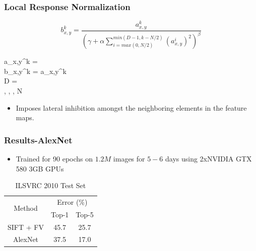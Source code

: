\documentclass[9pt]{beamer}
\begin{document}
\begin{frame}
	\frametitle{Local Response Normalization}
	\begin{minipage}[t]{\textwidth}	
		\begin{equation}
			b_{x,y}^{k} = 
			\frac{a_{x,y}^{k}}
			{\left(\gamma + \alpha \sum_{i=max(0,N/2)}^{min(D-1, k-N/2)} {\left(a_{x,y}^{i}\right)^2}\right)^\beta}
		\end{equation}
		\begin{multiline}
			a_{x,y}^{k} =  \\
			b_{x,y}^{k} =  \hspace{0.2em}a_{x,y}^{k} \\
			D =  \\
			\alpha, \beta, \gamma, N 
		\end{multiline}		
		\vspace{1em}
		\begin{itemize}
			\item Imposes lateral inhibition amongst the neighboring elements in the feature maps.			
		\end{itemize}
	\end{minipage}		
\end{frame}

\begin{frame}
	\frametitle{Results-AlexNet}
		\begin{itemize}
			\item Trained for 90 epochs on $1.2M$ images for $5-6$ days using 2xNVIDIA GTX 580 3GB GPUs 
		\end{itemize}	
		\begin{table}[]
		\centering
		\caption{ILSVRC 2010 Test Set}
		\label{my-label}
		\begin{tabular}{|c|c|c|}
		\hline
		\multirow{2}{*}{Method} & \multicolumn{2}{c|}{Error (\%)} \\ \cline{2-3} 
		 & Top-1 & Top-5 \\ \hline
		SIFT + FV & 45.7 & 25.7 \\ \hline
		AlexNet & 37.5 & 17.0 \\ \hline
		\end{tabular}
		\end{table}
\end{frame}
\end{document}
